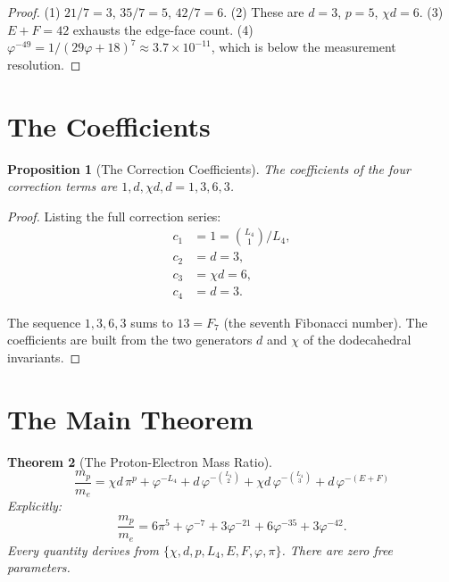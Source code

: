 \documentclass[11pt,a4paper]{article}
\theoremstyle{plain}
\newtheorem{theorem}{Theorem}[section]
\newtheorem{proposition}[theorem]{Proposition}
\theoremstyle{definition}
\newcommand{\vp}{\varphi}
\begin{document}
\begin{proof}
(1) $21/7 = 3$, $35/7 = 5$, $42/7 = 6$.
(2) These are $d = 3$, $p = 5$, $\chi d = 6$.
(3) $E + F = 42$ exhausts the edge-face count.
(4) $\vp^{-49} = 1/(29\vp+18)^7 \approx 3.7 \times 10^{-11}$, which is
below the measurement resolution.
\end{proof}

\section{The Coefficients}\label{sec:coefficients}

\begin{proposition}[The Correction Coefficients]\label{prop:coefficients}
The coefficients of the four correction terms are $1, d, \chi d, d = 1, 3, 6, 3$.
\end{proposition}

\begin{proof}
Listing the full correction series:
\begin{align*}
  c_1 &= 1 = \binom{L_4}{1}/L_4, \\
  c_2 &= d = 3, \\
  c_3 &= \chi d = 6, \\
  c_4 &= d = 3.
\end{align*}

The sequence $1, 3, 6, 3$ sums to $13 = F_7$ (the seventh Fibonacci
number).  The coefficients are built from the two generators $d$ and
$\chi$ of the dodecahedral invariants.
\end{proof}

\section{The Main Theorem}\label{sec:main}

\begin{theorem}[The Proton-Electron Mass Ratio]\label{thm:main}
\[
  \boxed{\;
    \frac{m_p}{m_e}
    = \chi d\,\pi^p
    + \vp^{-L_4}
    + d\,\vp^{-\binom{L_4}{2}}
    + \chi d\,\vp^{-\binom{L_4}{3}}
    + d\,\vp^{-(E+F)}
  \;}
\]
Explicitly:
\[
  \frac{m_p}{m_e}
  = 6\pi^5 + \vp^{-7} + 3\vp^{-21} + 6\vp^{-35} + 3\vp^{-42}.
\]
Every quantity derives from $\{\chi, d, p, L_4, E, F, \vp, \pi\}$.
There are zero free parameters.
\end{theorem}
\end{document}
